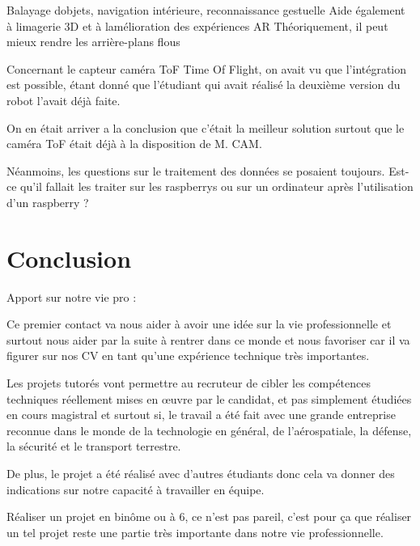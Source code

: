 \documentclass{PackagerQualityN}
\begin{document}
Balayage dobjets, navigation intérieure, reconnaissance gestuelle
Aide également à limagerie 3D et à lamélioration des expériences AR
Théoriquement, il peut mieux rendre les arrière-plans flous

Concernant le capteur caméra ToF Time Of Flight, on avait vu que l’intégration est possible, étant donné que l’étudiant qui avait réalisé la deuxième version du robot l’avait déjà faite.



On en était arriver a la conclusion que c'était la meilleur solution surtout que le caméra ToF était déjà à la disposition de M. CAM.

Néanmoins, les questions sur le traitement des données se posaient toujours. Est-ce qu'il fallait les traiter sur les raspberrys ou sur un ordinateur après l’utilisation d’un raspberry ?   

\newp


\newp




\newp
\section{Conclusion}


Apport sur notre vie pro :





Ce premier contact va nous aider à avoir une idée sur la vie professionnelle et surtout nous aider par la suite à rentrer dans ce monde et nous favoriser car il va figurer sur nos CV en tant qu’une expérience technique très importantes.

Les projets tutorés vont permettre au recruteur de cibler les compétences techniques réellement mises en œuvre par le candidat, et pas simplement étudiées en cours magistral et surtout si, le travail a été fait avec une grande entreprise reconnue dans le monde de la technologie en général, de l'aérospatiale, la défense, la sécurité et le transport terrestre.

De plus, le projet a été réalisé avec d’autres étudiants donc cela va donner des indications sur notre capacité à travailler en équipe. 

Réaliser un projet en binôme ou à 6, ce n’est pas pareil, c’est pour ça que réaliser un tel projet reste une partie très importante dans notre vie professionnelle.
\end{document}
